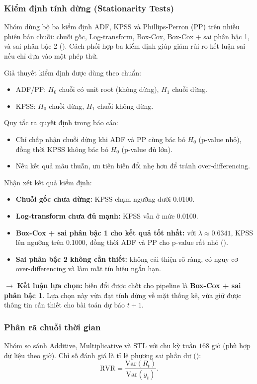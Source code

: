 \subsubsection{Kiểm định tính dừng (Stationarity Tests)}
Nhóm dùng bộ ba kiểm định ADF, KPSS và Phillips-Perron (PP) trên nhiều phiên bản chuỗi: chuỗi gốc, Log-transform, Box-Cox, Box-Cox + sai phân bậc 1, và sai phân bậc 2 (\cite{dickey1979distribution,kwiatkowski1992kpss,phillips1988pp}). Cách phối hợp ba kiểm định giúp giảm rủi ro kết luận sai nếu chỉ dựa vào một phép thử.

Giả thuyết kiểm định được dùng theo chuẩn:
\begin{itemize}
    \item ADF/PP: $H_0$ chuỗi có unit root (không dừng), $H_1$ chuỗi dừng.
    \item KPSS: $H_0$ chuỗi dừng, $H_1$ chuỗi không dừng.
\end{itemize}

Quy tắc ra quyết định trong báo cáo:
\begin{itemize}
    \item Chỉ chấp nhận chuỗi dừng khi ADF và PP cùng bác bỏ $H_0$ (p-value nhỏ), đồng thời KPSS không bác bỏ $H_0$ (p-value đủ lớn).
    \item Nếu kết quả mâu thuẫn, ưu tiên biến đổi nhẹ hơn để tránh over-differencing.
\end{itemize}

Nhận xét kết quả kiểm định:
\begin{itemize}
    \item \textbf{Chuỗi gốc chưa dừng:} KPSS chạm ngưỡng dưới 0.0100.
    \item \textbf{Log-transform chưa đủ mạnh:} KPSS vẫn ở mức 0.0100.
    \item \textbf{Box-Cox + sai phân bậc 1 cho kết quả tốt nhất:} với $\lambda \approx 0.6341$, KPSS lên ngưỡng trên 0.1000, đồng thời ADF và PP cho p-value rất nhỏ (\cite{box1964transformation}).
    \item \textbf{Sai phân bậc 2 không cần thiết:} không cải thiện rõ ràng, có nguy cơ over-differencing và làm mất tín hiệu ngắn hạn.
\end{itemize}

$\rightarrow$ \textbf{Kết luận lựa chọn:} biến đổi được chốt cho pipeline là \textbf{Box-Cox + sai phân bậc 1}. Lựa chọn này vừa đạt tính dừng về mặt thống kê, vừa giữ được thông tin cần thiết cho bài toán dự báo $t+1$.

\subsubsection{Phân rã chuỗi thời gian}
Nhóm so sánh Additive, Multiplicative và STL với chu kỳ tuần $168$ giờ (phù hợp dữ liệu theo giờ). Chỉ số đánh giá là tỉ lệ phương sai phần dư (\cite{cleveland1990stl}):
\[
    \mathrm{RVR} = \frac{\mathrm{Var}(R_t)}{\mathrm{Var}(y_t)}.
\]

